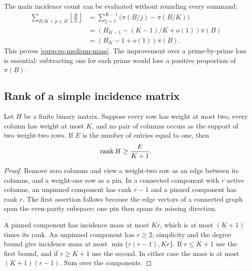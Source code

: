 The main incidence count can be evaluated without rounding every summand:
\begin{align*}
 \sum_{B/K<p\le B}\left\lfloor\frac Bp\right\rfloor
 &=\sum_{j=1}^{K-1}\bigl(\pi(B/j)-\pi(B/K)\bigr)\\
 &=(H_{K-1}-(K-1)/K+o(1))\pi(B)\\
 &=(H_K-1+o(1))\pi(B).
\end{align*}
This proves \eqref{supp:eq:medium-mass}. The improvement over a
prime-by-prime loss is essential: subtracting one for each prime would
lose a positive proportion of $\pi(B)$.

\subsection{Rank of a simple incidence matrix}
\begin{lemma}\label{supp:lem:simple-incidence}
Let $H$ be a finite binary matrix. Suppose every row has weight at most
two, every column has weight at most $K$, and no pair of columns occurs
as the support of two weight-two rows. If $E$ is the number of entries
equal to one, then
\[
 \operatorname{rank} H\ge\frac{E}{K+1}.
\]
\end{lemma}
\begin{proof}
Remove zero columns and view a weight-two row as an edge between its
columns, and a weight-one row as a pin. In a connected component with
$r$ active columns, an unpinned component has rank $r-1$ and a pinned
component has rank $r$. The first assertion follows because the edge
vectors of a connected graph span the even-parity subspace; one pin
then spans its missing direction.

A pinned component has incidence mass at most $Kr$, which is at most
$(K+1)$ times its rank. An unpinned component has $r\ge2$; simplicity
and the degree bound give incidence mass at most
$\min\{r(r-1),Kr\}$. If $r\le K+1$ use the first bound, and if
$r\ge K+1$ use the second. In either case the mass is at most
$(K+1)(r-1)$. Sum over the components.
\end{proof}

